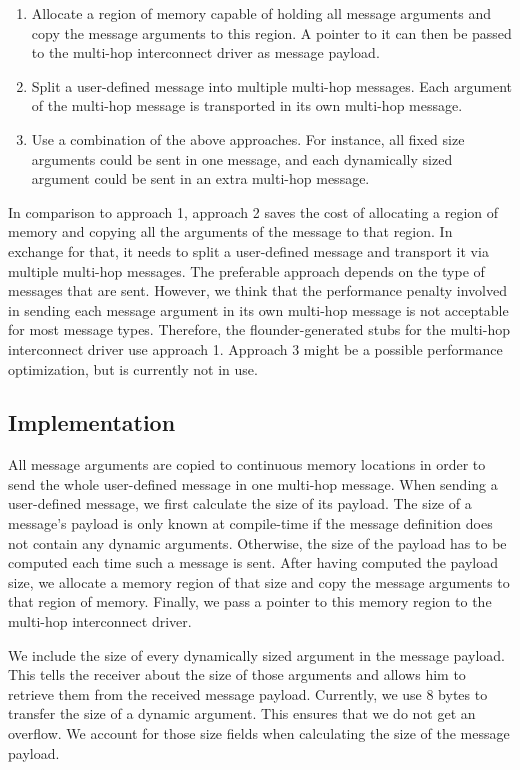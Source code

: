 \documentclass[a4paper,twoside]{report} %
\begin{document}
\begin{enumerate}
\item Allocate a region of memory capable of holding all message arguments and copy the message arguments to this region. A pointer to it can then be passed to the multi-hop interconnect driver as message payload.

\item Split a user-defined message into multiple multi-hop messages. Each argument of the multi-hop message is transported in its own multi-hop message. 

\item Use a combination of the above approaches. For instance, all fixed size arguments could be sent in one message, and each dynamically sized argument could be sent in an extra multi-hop message.
\end{enumerate}

In comparison to approach 1, approach 2 saves the cost of allocating a region of memory and copying all the arguments of the message to that region. In exchange for that, it needs to split a user-defined message and transport it via multiple multi-hop messages. The preferable approach depends on the type of messages that are sent. However, we think that the performance penalty involved in sending each message argument in its own multi-hop message is not acceptable for most message types. Therefore, the flounder-generated stubs for the multi-hop interconnect driver use approach 1. Approach 3 might be a possible performance optimization, but is currently not in use.

\subsection{Implementation}
All message arguments are copied to continuous memory locations in order to send the whole user-defined message in one multi-hop message.
When sending a user-defined message, we first calculate the size of its payload. The size of a message's payload is only known at compile-time if the message definition does not contain any dynamic arguments. Otherwise, the size of the payload has to be computed each time such a message is sent. After having computed the payload size, we allocate a memory region of that size and copy the message arguments to that region of memory. Finally, we pass a pointer to this memory region to the multi-hop interconnect driver.

We include the size of every dynamically sized argument in the message payload. This tells the receiver about the size of those arguments and allows him to retrieve them from the received message payload. Currently, we use 8 bytes to transfer the size of a dynamic argument. This ensures that we do not get an overflow. We account for those size fields when calculating the size of the message payload.
\end{document}
